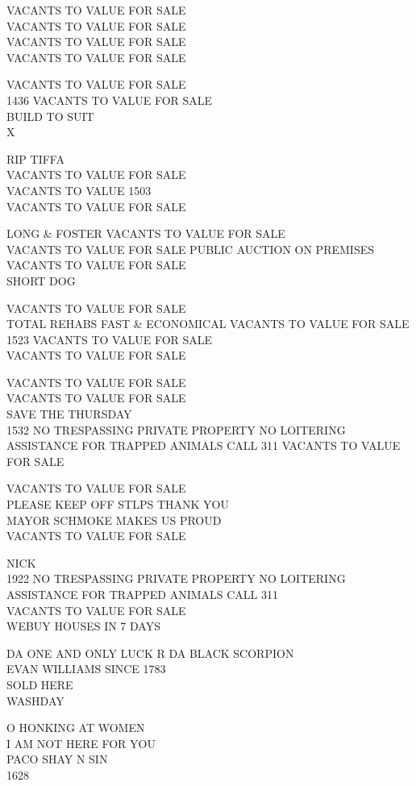 \documentclass[10pt,letterpaper]{article}
\begin{document}
VACANTS TO VALUE FOR SALE\\
VACANTS TO VALUE FOR SALE\\
VACANTS TO VALUE FOR SALE\\
VACANTS TO VALUE FOR SALE

VACANTS TO VALUE FOR SALE\\
1436 VACANTS TO VALUE FOR SALE\\
BUILD TO SUIT\\
X

RIP TIFFA\\
VACANTS TO VALUE FOR SALE\\
VACANTS TO VALUE 1503\\
VACANTS TO VALUE FOR SALE

LONG \& FOSTER VACANTS TO VALUE FOR SALE\\
VACANTS TO VALUE FOR SALE PUBLIC AUCTION ON PREMISES\\
VACANTS TO VALUE FOR SALE\\
SHORT DOG

VACANTS TO VALUE FOR SALE\\
TOTAL REHABS FAST \& ECONOMICAL VACANTS TO VALUE FOR SALE\\
1523 VACANTS TO VALUE FOR SALE\\
VACANTS TO VALUE FOR SALE

VACANTS TO VALUE FOR SALE\\
VACANTS TO VALUE FOR SALE\\
SAVE THE THURSDAY\\
1532 NO TRESPASSING PRIVATE PROPERTY NO LOITERING ASSISTANCE FOR TRAPPED ANIMALS CALL 311 VACANTS TO VALUE FOR SALE

VACANTS TO VALUE FOR SALE\\
PLEASE KEEP OFF STLPS THANK YOU\\
MAYOR SCHMOKE MAKES US PROUD\\
VACANTS TO VALUE FOR SALE

NICK\\
1922 NO TRESPASSING PRIVATE PROPERTY NO LOITERING ASSISTANCE FOR TRAPPED ANIMALS CALL 311\\
VACANTS TO VALUE FOR SALE\\
WEBUY HOUSES IN 7 DAYS

DA ONE AND ONLY LUCK R DA BLACK SCORPION\\
EVAN WILLIAMS SINCE 1783\\
SOLD HERE\\
WASHDAY

O HONKING AT WOMEN\\
I AM NOT HERE FOR YOU\\
PACO SHAY N SIN\\
1628
\end{document}
